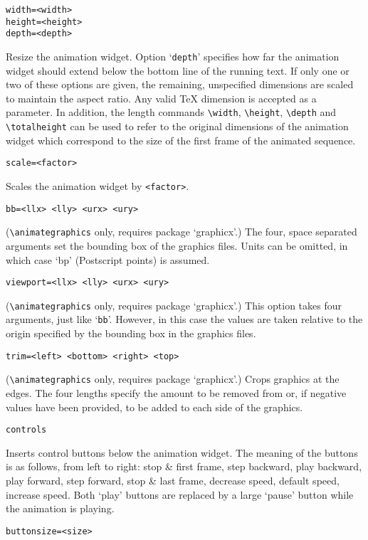 \documentclass[a4paper]{article}
\begin{document}
\begin{verbatim}
width=<width>
height=<height>
depth=<depth>
\end{verbatim}
Resize the animation widget. Option `\verb+depth+' specifies how far the animation widget should extend below the bottom line of the running text. If only one or two of these options are given, the remaining, unspecified dimensions are scaled to maintain the aspect ratio. Any valid \TeX{} dimension is accepted as a parameter. In addition, the length commands \verb+\width+, \verb+\height+, \verb+\depth+ and \verb+\totalheight+ can be used to refer to the original dimensions of the animation widget which correspond to the size of the first frame of the animated sequence.
\begin{verbatim}
scale=<factor>
\end{verbatim}
Scales the animation widget by \verb+<factor>+.
\begin{verbatim}
bb=<llx> <lly> <urx> <ury>
\end{verbatim}
(\verb+\animategraphics+ only, requires package `graphicx'.) The four, space separated arguments set the bounding box of the graphics files. Units can be omitted, in which case `bp' (Postscript points) is assumed.
\begin{verbatim}
viewport=<llx> <lly> <urx> <ury>
\end{verbatim}
(\verb+\animategraphics+ only, requires package `graphicx'.) This option takes four arguments, just like `\verb+bb+'. However, in this case the values are taken relative to the origin specified by the bounding box in the graphics files.
\begin{verbatim}
trim=<left> <bottom> <right> <top>
\end{verbatim}
(\verb+\animategraphics+ only, requires package `graphicx'.) Crops graphics at the edges. The four lengths specify the amount to be removed from or, if negative values have been provided, to be added to each side of the graphics.
\begin{verbatim}
controls
\end{verbatim}
Inserts control buttons below the animation widget. The meaning of the buttons is as follows, from left to right: stop \& first frame, step backward, play backward, play forward, step forward, stop \& last frame, decrease speed, default speed, increase speed. Both `play' buttons are replaced by a large `pause' button while the animation is playing.
\begin{verbatim}
buttonsize=<size>
\end{verbatim}
\end{document}
